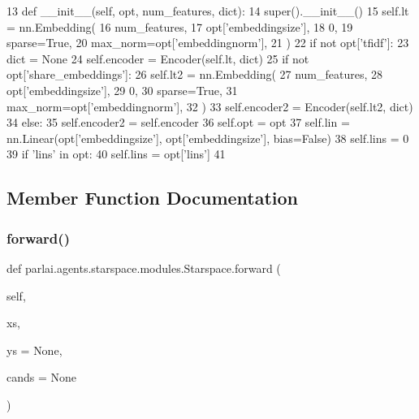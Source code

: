 \begin{DoxyCode}
13     \textcolor{keyword}{def }\_\_init\_\_(self, opt, num\_features, dict):
14         super().\_\_init\_\_()
15         self.lt = nn.Embedding(
16             num\_features,
17             opt[\textcolor{stringliteral}{'embeddingsize'}],
18             0,
19             sparse=\textcolor{keyword}{True},
20             max\_norm=opt[\textcolor{stringliteral}{'embeddingnorm'}],
21         )
22         \textcolor{keywordflow}{if} \textcolor{keywordflow}{not} opt[\textcolor{stringliteral}{'tfidf'}]:
23             dict = \textcolor{keywordtype}{None}
24         self.encoder = Encoder(self.lt, dict)
25         \textcolor{keywordflow}{if} \textcolor{keywordflow}{not} opt[\textcolor{stringliteral}{'share\_embeddings'}]:
26             self.lt2 = nn.Embedding(
27                 num\_features,
28                 opt[\textcolor{stringliteral}{'embeddingsize'}],
29                 0,
30                 sparse=\textcolor{keyword}{True},
31                 max\_norm=opt[\textcolor{stringliteral}{'embeddingnorm'}],
32             )
33             self.encoder2 = Encoder(self.lt2, dict)
34         \textcolor{keywordflow}{else}:
35             self.encoder2 = self.encoder
36         self.opt = opt
37         self.lin = nn.Linear(opt[\textcolor{stringliteral}{'embeddingsize'}], opt[\textcolor{stringliteral}{'embeddingsize'}], bias=\textcolor{keyword}{False})
38         self.lins = 0
39         \textcolor{keywordflow}{if} \textcolor{stringliteral}{'lins'} \textcolor{keywordflow}{in} opt:
40             self.lins = opt[\textcolor{stringliteral}{'lins'}]
41 
\end{DoxyCode}


\subsection{Member Function Documentation}
\mbox{\label{classparlai_1_1agents_1_1starspace_1_1modules_1_1Starspace_a08e4e81ef10c1ec4c09ab6c8147690ab}} 
\subsubsection{\texorpdfstring{forward()}{forward()}}
{\footnotesize\ttfamily def parlai.\+agents.\+starspace.\+modules.\+Starspace.\+forward (\begin{DoxyParamCaption}\item[{}]{self,  }\item[{}]{xs,  }\item[{}]{ys = {\ttfamily None},  }\item[{}]{cands = {\ttfamily None} }\end{DoxyParamCaption})}



